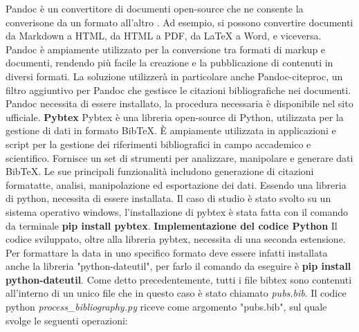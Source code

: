 \documentclass[target=bach,aauheader=]{thud}
\begin{document}
Pandoc è un convertitore di documenti open-source che ne consente la converisone da un formato all'altro \cite{pandoc}. Ad esempio, si possono convertire documenti da Markdown a HTML, da HTML a PDF, da LaTeX a Word, e viceversa.
Pandoc è ampiamente utilizzato per la conversione tra formati di markup e documenti, rendendo più facile la creazione e la pubblicazione di contenuti in diversi formati.
\newline
La soluzione utilizzerà in particolare anche Pandoc-citeproc, un filtro aggiuntivo per Pandoc che gestisce le citazioni bibliografiche nei documenti.
\newline
Pandoc necessita di essere installato, la procedura necessaria è disponibile nel sito ufficiale.
\newline \newline
\textbf{{\fontsize{12}{14}\selectfont Pybtex}}
\newline \newline
Pybtex è una libreria open-source di Python, utilizzata per la gestione di dati in formato BibTeX. È ampiamente utilizzata in applicazioni e script per la gestione dei riferimenti bibliografici in campo accademico e scientifico.
\newline
Fornisce un set di strumenti per analizzare, manipolare e generare dati BibTeX. Le sue principali funzionalità includono generazione di citazioni formatatte, analisi, manipolazione ed esportazione dei dati. 
\newline
Essendo una libreria di python, necessita di essere installata. Il caso di studio è stato svolto su un sistema operativo windows, l'installazione di pybtex è stata fatta con il comando da terminale \textbf{pip install pybtex}.
\newline \newline
\textbf{{\fontsize{12}{14}\selectfont Implementazione del codice Python}}
\newline \newline
Il codice sviluppato, oltre alla libreria pybtex, necessita di una seconda estensione. Per formattare la data in uno specifico formato deve essere infatti installata anche la libreria "python-dateutil", per farlo il comando da eseguire è \textbf{pip install python-dateutil}.
\newline
Come detto precedentemente, tutti i file bibtex sono contenuti all'interno di un unico file che in questo caso è stato chiamato \textit{pubs.bib}. Il codice python \textit{process\_bibliography.py} riceve come argomento "pubs.bib", sul quale svolge le seguenti operazioni:
\end{document}
